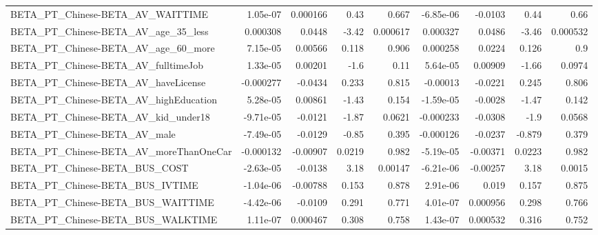 \begin{tabular}{lrrrrrrrr}
BETA\_PT\_Chinese-BETA\_AV\_WAITTIME                   &    1.05e-07 &     0.000166 &     0.43 &    0.667 &  -6.85e-06 &     -0.0103 &         0.44 &          0.66 \\
BETA\_PT\_Chinese-BETA\_AV\_age\_35\_less                &    0.000308 &       0.0448 &    -3.42 & 0.000617 &   0.000327 &      0.0486 &        -3.46 &      0.000532 \\
BETA\_PT\_Chinese-BETA\_AV\_age\_60\_more                &    7.15e-05 &      0.00566 &    0.118 &    0.906 &   0.000258 &      0.0224 &        0.126 &           0.9 \\
BETA\_PT\_Chinese-BETA\_AV\_fulltimeJob                &    1.33e-05 &      0.00201 &     -1.6 &     0.11 &   5.64e-05 &     0.00909 &        -1.66 &        0.0974 \\
BETA\_PT\_Chinese-BETA\_AV\_haveLicense                &   -0.000277 &      -0.0434 &    0.233 &    0.815 &   -0.00013 &     -0.0221 &        0.245 &         0.806 \\
BETA\_PT\_Chinese-BETA\_AV\_highEducation              &    5.28e-05 &      0.00861 &    -1.43 &    0.154 &  -1.59e-05 &     -0.0028 &        -1.47 &         0.142 \\
BETA\_PT\_Chinese-BETA\_AV\_kid\_under18                &   -9.71e-05 &      -0.0121 &    -1.87 &   0.0621 &  -0.000233 &     -0.0308 &         -1.9 &        0.0568 \\
BETA\_PT\_Chinese-BETA\_AV\_male                       &   -7.49e-05 &      -0.0129 &    -0.85 &    0.395 &  -0.000126 &     -0.0237 &       -0.879 &         0.379 \\
BETA\_PT\_Chinese-BETA\_AV\_moreThanOneCar             &   -0.000132 &     -0.00907 &   0.0219 &    0.982 &  -5.19e-05 &    -0.00371 &       0.0223 &         0.982 \\
BETA\_PT\_Chinese-BETA\_BUS\_COST                      &   -2.63e-05 &      -0.0138 &     3.18 &  0.00147 &  -6.21e-06 &    -0.00257 &         3.18 &        0.0015 \\
BETA\_PT\_Chinese-BETA\_BUS\_IVTIME                    &   -1.04e-06 &     -0.00788 &    0.153 &    0.878 &   2.91e-06 &       0.019 &        0.157 &         0.875 \\
BETA\_PT\_Chinese-BETA\_BUS\_WAITTIME                  &   -4.42e-06 &      -0.0109 &    0.291 &    0.771 &   4.01e-07 &    0.000956 &        0.298 &         0.766 \\
BETA\_PT\_Chinese-BETA\_BUS\_WALKTIME                  &    1.11e-07 &     0.000467 &    0.308 &    0.758 &   1.43e-07 &    0.000532 &        0.316 &         0.752 \\

\end{tabular}
